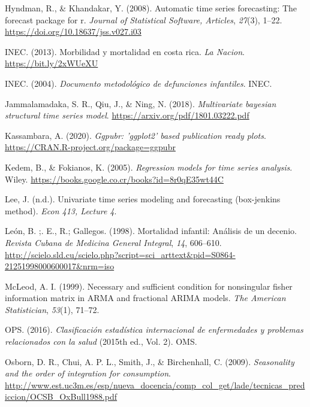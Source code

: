 \documentclass[
]{article}
\newlength{\cslhangindent}
\newlength{\cslentryspacingunit} %
\newenvironment{CSLReferences}[2] %
 {%
  \setlength{\parindent}{0pt}
  \ifodd #1
  \let\oldpar\par
  \def\par{\hangindent=\cslhangindent\oldpar}
  \fi
  \setlength{\parskip}{#2\cslentryspacingunit}
 }%
 {}
\begin{document}
\begin{CSLReferences}{1}{0}
\leavevmode{}%
Hyndman, R., \& Khandakar, Y. (2008). Automatic time series forecasting:
The forecast package for r. \emph{Journal of Statistical Software,
Articles}, \emph{27}(3), 1--22.
\url{https://doi.org/10.18637/jss.v027.i03}

\leavevmode{}%
INEC. (2013). Morbilidad y mortalidad en costa rica. \emph{La Nacion}.
\url{https://bit.ly/2xWUeXU}

\leavevmode{}%
INEC. (2004). \emph{Documento metodológico de defunciones infantiles}.
INEC.

\leavevmode{}%
Jammalamadaka, S. R., Qiu, J., \& Ning, N. (2018). \emph{Multivariate
bayesian structural time series model}.
\url{https://arxiv.org/pdf/1801.03222.pdf}

\leavevmode{}%
Kassambara, A. (2020). \emph{Ggpubr: 'ggplot2' based publication ready
plots}. \url{https://CRAN.R-project.org/package=ggpubr}

\leavevmode{}%
Kedem, B., \& Fokianos, K. (2005). \emph{Regression models for time
series analysis}. Wiley.
\url{https://books.google.co.cr/books?id=8r0qE35wt44C}

\leavevmode{}%
Lee, J. (n.d.). Univariate time series modeling and forecasting
(box-jenkins method). \emph{Econ 413, Lecture 4}.

\leavevmode{}%
León, B. ;. E., R.; Gallegos. (1998). {Mortalidad infantil: Análisis de
un decenio}. \emph{{Revista Cubana de Medicina General Integral}},
\emph{14}, 606--610.
\url{http://scielo.sld.cu/scielo.php?script=sci_arttext\&pid=S0864-21251998000600017\&nrm=iso}

\leavevmode{}%
McLeod, A. I. (1999). Necessary and sufficient condition for nonsingular
fisher information matrix in ARMA and fractional ARIMA models. \emph{The
American Statistician}, \emph{53}(1), 71--72.

\leavevmode{}%
OPS. (2016). \emph{Clasificación estadística internacional de
enfermedades y problemas relacionados con la salud} (2015th ed., Vol.
2). OMS.

\leavevmode{}%
Osborn, D. R., Chui, A. P. L., Smith, J., \& Birchenhall, C. (2009).
\emph{Seasonality and the order of integration for consumption}.
\url{http://www.est.uc3m.es/esp/nueva_docencia/comp_col_get/lade/tecnicas_prediccion/OCSB_OxBull1988.pdf}


\end{CSLReferences}
\end{document}
